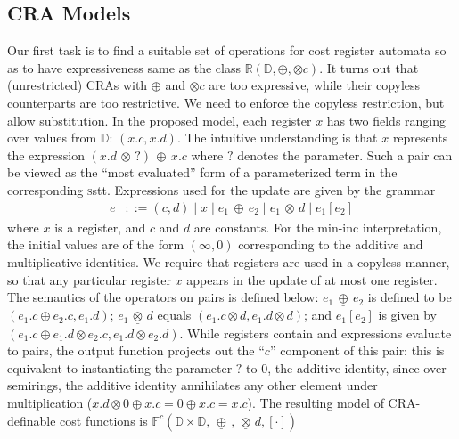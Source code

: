 \documentclass[11pt]{article}
\newcommand{\mypar}[1]{\subsection{#1}}
\newcommand{\domain}{\ensuremath{\mathbb{D}}}
\def\hole{?}
\newcommand{\CCF}{{\mathbb F}^c}
\newcommand{\reg}[1]{{\mathbb R}(#1)}
\newcommand{\sradd}{\oplus}
\newcommand{\srmul}{\otimes}
\newcommand{\SSTT}{{\sc\textsc sstt}\xspace}
\def\myplus{\otimes}
\def\mytimes{\oplus}
\def\dadd{\,\underline\mytimes\,}
\def\dscale{\,\underline\myplus\,}
\begin{document}
\mypar{CRA Models}
Our first task is to find a suitable set of operations for cost register automata so as
to have expressiveness same as the class  $\reg{\domain,\sradd,\srmul c}$.
It turns out that (unrestricted) CRAs with $\sradd$ and $\srmul c$ are too expressive,
while their copyless counterparts are too restrictive.
We need to enforce the copyless restriction, but allow substitution.
In the proposed model, each register $x$
has two fields ranging over values from $\domain$: $\left(x.c,x.d\right)$.
The intuitive understanding is that $x$ represents the expression
$\left(x.d\, \srmul\, \hole \right)\, \sradd\, x.c$ where $\hole$ denotes the parameter.
Such a pair can be viewed as the ``most evaluated'' form
of a parameterized term in the corresponding \SSTT.
Expressions used for the update are given by the grammar
\begin{align*}
e & ::=\left(c,d\right)\mid x\mid e_{1} \dadd e_{2}\mid e_{1} \dscale d\mid e_{1}\left[e_{2}\right]
\end{align*}
where $x$ is a register, and $c$ and $d$ are constants.
For the min-inc interpretation, the initial values are of the form
$\left(\infty,0\right)$ corresponding to the additive
and multiplicative identities.
We require that registers are used in a copyless manner, so that any
particular register $x$ appears in the update of at most one register.
The semantics of the operators on pairs is defined below:
$e_{1}\dadd e_{2}$ is defined to be  $\left(e_{1}.c\sradd e_{2}.c,e_{1}.d\right)$;
$e_{1}\dscale d$ equals $\left(e_{1}.c\srmul d,e_{1}.d\srmul d\right)$; and
$e_{1}\left[e_{2}\right]$ is given by $\left(e_{1}.c\sradd e_{1}.d\srmul e_{2}.c,e_{1}.d\srmul e_{2}.d\right)$.
While registers contain and expressions evaluate to pairs, the output function projects out
the ``$c$'' component of this pair: this is equivalent to instantiating the parameter $?$ to $0$, the additive
identity, since over semirings, the additive identity annihilates any other element under multiplication
($x.d \srmul 0 \sradd x.c = 0 \sradd x.c = x.c$).
The resulting model of CRA-definable cost functions is
$\CCF\left(\domain\times\domain,\dadd,\dscale d,\left[\cdot\right]\right)$
\end{document}
